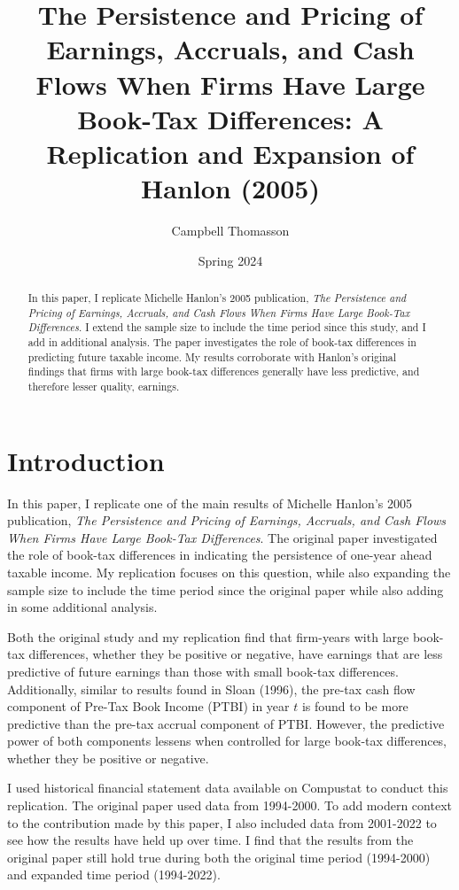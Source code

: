 \documentclass[12pt]{article}
\title{The Persistence and Pricing of Earnings, Accruals, and Cash Flows When Firms Have Large Book-Tax Differences: A Replication and Expansion of Hanlon (2005)}
\author{Campbell Thomasson}
\date{Spring 2024}
\begin{document}
\maketitle

\begin{abstract}
In this paper, I replicate Michelle Hanlon's 2005 publication, \textit{The Persistence and Pricing of Earnings, Accruals, and Cash Flows When Firms Have Large Book-Tax Differences}. I extend the sample size to include the time period since this study, and I add in additional analysis. The paper investigates the role of book-tax differences in predicting future taxable income. My results corroborate with Hanlon's original findings that firms with large book-tax differences generally have less predictive, and therefore lesser quality, earnings.
\end{abstract}

\section{Introduction}
In this paper, I replicate one of the main results of Michelle Hanlon’s 2005 publication, \textit{The Persistence and Pricing of Earnings, Accruals, and Cash Flows When Firms Have Large Book-Tax Differences}. The original paper investigated the role of book-tax differences in indicating the persistence of one-year ahead taxable income. My replication focuses on this question, while also expanding the sample size to include the time period since the original paper while also adding in some additional analysis.

Both the original study and my replication find that firm-years with large book-tax differences, whether they be positive or negative, have earnings that are less predictive of future earnings than those with small book-tax differences. Additionally, similar to results found in Sloan (1996), the pre-tax cash flow component of Pre-Tax Book Income (PTBI) in year $t$ is found to be more predictive than the pre-tax accrual component of PTBI. However, the predictive power of both components lessens when controlled for large book-tax differences, whether they be positive or negative.

I used historical financial statement data available on Compustat to conduct this replication. The original paper used data from 1994-2000. To add modern context to the contribution made by this paper, I also included data from 2001-2022 to see how the results have held up over time. I find that the results from the original paper still hold true during both the original time period (1994-2000) and expanded time period (1994-2022).
\end{document}
